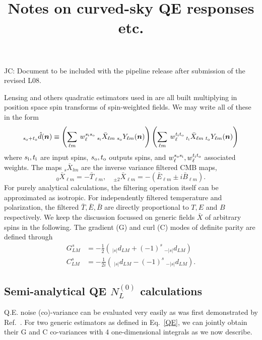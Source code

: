\documentclass{article}
\newcommand{\si}[0]{{s_{\rm i}}}
\newcommand{\ti}[0]{{t_{\rm i}}}
\newcommand{\so}[0]{{s_{\rm o}}}
\renewcommand{\to}[0]{{t_{\rm o}}}
\newcommand{\JC}[1]{\color{red}JC: #1\color{black}}
\newcommand{\hn}[0]{\boldsymbol{n}}
\begin{document}
\title{Notes on curved-sky QE responses etc.}
\maketitle
\tableofcontents
\vspace{1cm}
\JC{Document to be included with the pipeline release after submission of the revised L08.}

Lensing and others quadratic estimators used in \cite{??} are all built multiplying in position space spin transforms of spin-weighted fields. We may write all of these in the form \begin{equation}\label{QE}
 _{\so + \to}\hat d(\hn) \equiv  \left(\sum_{\ell m}\: w^{\si\so}_\ell \:_{\si} \bar X_{\ell m} \:_\so Y_{\ell m}(\hn)\right)\left(\sum_{\ell m}\:w^{\ti\to}_\ell  \:_{\ti} \bar X_{\ell m} \:_\to Y_{\ell m}(\hn)\right)
\end{equation}
where $\si, \ti$ are input spins, $\so, \to$ outputs spins, and $w_\ell^{\so\si}, w_\ell^{\ti\to}$ associated weights. The maps $_s \bar X_{lm}$ are the inverse variance filtered CMB maps,
\begin{equation}
	_0 \bar X_{\ell m} = -\bar T_{\ell m} , \quad _{\pm 2} \bar X_{\ell m} = -\left(\bar E_{\ell m} \pm i\bar B_{\ell m} \right).
\end{equation}
For purely analytical calculations, the filtering operation itself can be approximated as isotropic. For independently filtered temperature and polarization, the filtered $\bar T, \bar E, \bar B$ are directly proportional to $T, E$ and $B$ respectively. 
We keep the discussion focussed on generic fields $\bar X$ of arbitrary spins in the following. The gradient (G) and curl (C) modes of definite parity are defined through
\begin{eqnarray*}
		G^{s}_{LM} &= -\frac 12\left(\:_{|s|} d_{LM} + (-1)^s \:_{-|s|} d_{LM}\right)  \\
		C^{s}_{LM} &=-\frac 1{2i} \left( \:_{|s|} d_{LM} - (-1)^s \:_{-|s|} d_{LM} \right) .
\end{eqnarray*}
\subsection{Semi-analytical QE $N^{(0)}_L$ calculations}
Q.E. noise (co)-variance can be evaluated very easily as was first demonstrated by Ref.~\cite{}. For two generic estimators as defined in Eq.~\eqref{QE}, we can jointly obtain their G and C co-variances with 4 one-dimensional integrals as we now describe.
\end{document}
